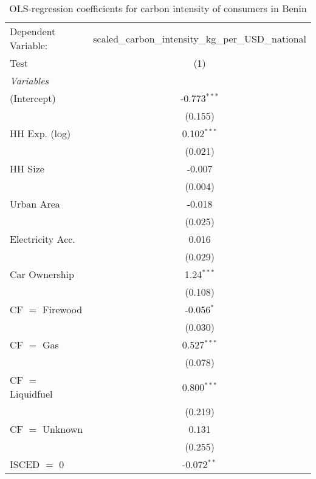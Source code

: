 
\begin{table}[htbp!]
   \centering
   \small
   \begin{adjustbox}{width = 1\textwidth, max height = 0.95\textheight, center}
      \begin{threeparttable}[b]
         \caption{\label{tab:OLS_1_BEN} OLS-regression coefficients for carbon intensity of consumers in Benin}
         \begin{tabular}{lc}
            \tabularnewline \midrule \midrule
            Dependent Variable: & scaled\_carbon\_intensity\_kg\_per\_USD\_national\\        
            Test                & (1)\\  
            \midrule
            \emph{Variables}\\
            (Intercept)         & -0.773$^{***}$\\   
                                & (0.155)\\   
            HH Exp. (log)       & 0.102$^{***}$\\   
                                & (0.021)\\   
            HH Size             & -0.007\\   
                                & (0.004)\\   
            Urban Area          & -0.018\\   
                                & (0.025)\\   
            Electricity Acc.    & 0.016\\   
                                & (0.029)\\   
            Car Ownership       & 1.24$^{***}$\\   
                                & (0.108)\\   
            CF $=$ Firewood     & -0.056$^{*}$\\   
                                & (0.030)\\   
            CF $=$ Gas          & 0.527$^{***}$\\   
                                & (0.078)\\   
            CF $=$ Liquidfuel   & 0.800$^{***}$\\   
                                & (0.219)\\   
            CF $=$ Unknown      & 0.131\\   
                                & (0.255)\\   
            ISCED $=$ 0         & -0.072$^{**}$\\   

\end{tabular}
\end{threeparttable}
\end{adjustbox}
\end{table}

